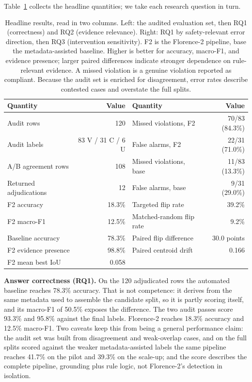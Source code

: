 \documentclass[12pt,letterpaper]{article}
\begin{document}
Table~\ref{tab:headline} collects the headline quantities; we take each research question in turn.

\begin{table}[h]
\centering
\caption{Headline results, read in two columns. Left: the audited evaluation set, then RQ1 (correctness) and RQ2 (evidence relevance). Right: RQ1 by safety-relevant error direction, then RQ3 (intervention sensitivity). F2 is the Florence-2 pipeline, base the metadata-assisted baseline. Higher is better for accuracy, macro-F1, and evidence presence; larger paired differences indicate stronger dependence on rule-relevant evidence. A missed violation is a genuine violation reported as compliant. Because the audit set is enriched for disagreement, error rates describe contested cases and overstate the full splits.}
\label{tab:headline}
{\small
\begin{tabular}{lr@{\hspace{2.2em}}lr}
\toprule
Quantity & Value & Quantity & Value \\
\midrule
Audit rows & 120 & Missed violations, F2 & 70/83 (84.3\%) \\
Audit labels & 83 V / 31 C / 6 U & False alarms, F2 & 22/31 (71.0\%) \\
A/B agreement rows & 108 & Missed violations, base & 11/83 (13.3\%) \\
Returned adjudications & 12 & False alarms, base & 9/31 (29.0\%) \\
\addlinespace
F2 accuracy & 18.3\% & Targeted flip rate & 39.2\% \\
F2 macro-F1 & 12.5\% & Matched-random flip rate & 9.2\% \\
Baseline accuracy & 78.3\% & Paired flip difference & 30.0 points \\
F2 evidence presence & 98.8\% & Paired centroid drift & 0.166 \\
F2 mean best IoU & 0.058 & & \\
\bottomrule
\end{tabular}
\par}
\end{table}

\textbf{Answer correctness (RQ1).} On the 120 adjudicated rows the automated baseline reaches 78.3\% accuracy. That is not competence: it derives from the same metadata used to assemble the candidate split, so it is partly scoring itself, and its macro-F1 of 50.5\% exposes the difference. The two audit passes score 93.3\% and 95.8\% against the final labels. Florence-2 reaches 18.3\% accuracy and 12.5\% macro-F1. Two caveats keep this from being a general performance claim: the audit set was built from disagreement and weak-overlap cases, and on the full splits scored against the weaker metadata-assisted labels the same pipeline reaches 41.7\% on the pilot and 39.3\% on the scale-up; and the score describes the complete pipeline, grounding plus rule logic, not Florence-2's detection in isolation.
\end{document}
